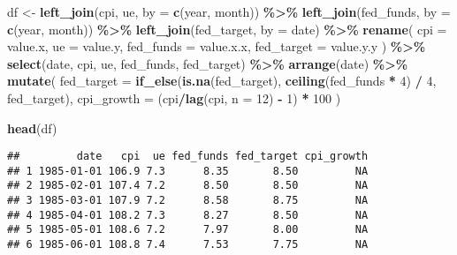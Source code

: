 \documentclass[
]{article}
\newenvironment{Shaded}{\begin{snugshade}}{\end{snugshade}}
\newcommand{\AttributeTok}[1]{\textcolor[rgb]{0.13,0.29,0.53}{#1}}
\newcommand{\DecValTok}[1]{\textcolor[rgb]{0.00,0.00,0.81}{#1}}
\newcommand{\FunctionTok}[1]{\textcolor[rgb]{0.13,0.29,0.53}{\textbf{#1}}}
\newcommand{\NormalTok}[1]{#1}
\newcommand{\OtherTok}[1]{\textcolor[rgb]{0.56,0.35,0.01}{#1}}
\newcommand{\SpecialCharTok}[1]{\textcolor[rgb]{0.81,0.36,0.00}{\textbf{#1}}}
\newcommand{\StringTok}[1]{\textcolor[rgb]{0.31,0.60,0.02}{#1}}
\begin{document}
\begin{Shaded}
\begin{Highlighting}[]
\NormalTok{df }\OtherTok{\textless{}{-}} \FunctionTok{left\_join}\NormalTok{(cpi, ue, }\AttributeTok{by =} \FunctionTok{c}\NormalTok{(}\StringTok{\textquotesingle{}year\textquotesingle{}}\NormalTok{, }\StringTok{\textquotesingle{}month\textquotesingle{}}\NormalTok{)) }\SpecialCharTok{\%\textgreater{}\%}
  \FunctionTok{left\_join}\NormalTok{(fed\_funds, }\AttributeTok{by =} \FunctionTok{c}\NormalTok{(}\StringTok{\textquotesingle{}year\textquotesingle{}}\NormalTok{, }\StringTok{\textquotesingle{}month\textquotesingle{}}\NormalTok{)) }\SpecialCharTok{\%\textgreater{}\%}
  \FunctionTok{left\_join}\NormalTok{(fed\_target, }\AttributeTok{by =} \StringTok{\textquotesingle{}date\textquotesingle{}}\NormalTok{) }\SpecialCharTok{\%\textgreater{}\%}
  \FunctionTok{rename}\NormalTok{(}
    \AttributeTok{cpi =}\NormalTok{ value.x, }\AttributeTok{ue =}\NormalTok{ value.y, }
    \AttributeTok{fed\_funds =}\NormalTok{ value.x.x, }\AttributeTok{fed\_target =}\NormalTok{ value.y.y}
\NormalTok{  ) }\SpecialCharTok{\%\textgreater{}\%}
  \FunctionTok{select}\NormalTok{(date, cpi, ue, fed\_funds, fed\_target) }\SpecialCharTok{\%\textgreater{}\%}
  \FunctionTok{arrange}\NormalTok{(date) }\SpecialCharTok{\%\textgreater{}\%}
  \FunctionTok{mutate}\NormalTok{(}
    \AttributeTok{fed\_target =} \FunctionTok{if\_else}\NormalTok{(}\FunctionTok{is.na}\NormalTok{(fed\_target), }\FunctionTok{ceiling}\NormalTok{(fed\_funds }\SpecialCharTok{*} \DecValTok{4}\NormalTok{) }\SpecialCharTok{/} \DecValTok{4}\NormalTok{, fed\_target),}
    \AttributeTok{cpi\_growth =}\NormalTok{ (cpi}\SpecialCharTok{/}\FunctionTok{lag}\NormalTok{(cpi, }\AttributeTok{n =} \DecValTok{12}\NormalTok{) }\SpecialCharTok{{-}} \DecValTok{1}\NormalTok{) }\SpecialCharTok{*} \DecValTok{100}
\NormalTok{  ) }

\FunctionTok{head}\NormalTok{(df)}
\end{Highlighting}
\end{Shaded}

\begin{verbatim}
##         date   cpi  ue fed_funds fed_target cpi_growth
## 1 1985-01-01 106.9 7.3      8.35       8.50         NA
## 2 1985-02-01 107.4 7.2      8.50       8.50         NA
## 3 1985-03-01 107.9 7.2      8.58       8.75         NA
## 4 1985-04-01 108.2 7.3      8.27       8.50         NA
## 5 1985-05-01 108.6 7.2      7.97       8.00         NA
## 6 1985-06-01 108.8 7.4      7.53       7.75         NA
\end{verbatim}
\end{document}
